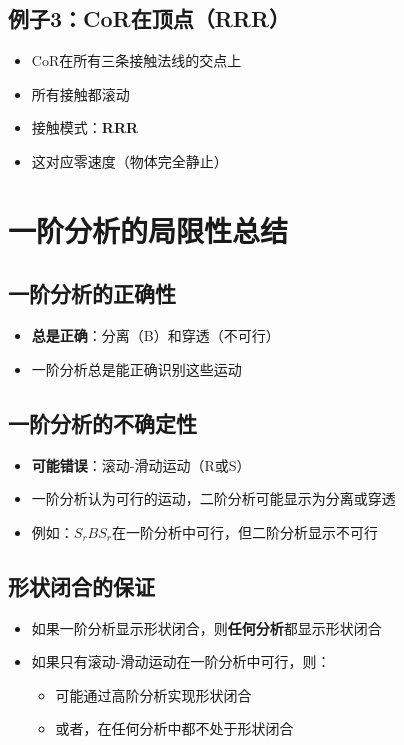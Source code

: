 \documentclass[12pt,a4paper]{article}
\begin{document}
\subsection{例子3：CoR在顶点（RRR）}

\begin{itemize}
\item CoR在所有三条接触法线的交点上
\item 所有接触都滚动
\item 接触模式：\textbf{RRR}
\item 这对应零速度（物体完全静止）
\end{itemize}

\section{一阶分析的局限性总结}

\subsection{一阶分析的正确性}

\begin{itemize}
\item \textbf{总是正确}：分离（B）和穿透（不可行）
\item 一阶分析总是能正确识别这些运动
\end{itemize}

\subsection{一阶分析的不确定性}

\begin{itemize}
\item \textbf{可能错误}：滚动-滑动运动（R或S）
\item 一阶分析认为可行的运动，二阶分析可能显示为分离或穿透
\item 例如：$S_rBS_r$在一阶分析中可行，但二阶分析显示不可行
\end{itemize}

\subsection{形状闭合的保证}

\begin{itemize}
\item 如果一阶分析显示形状闭合，则\textbf{任何分析}都显示形状闭合
\item 如果只有滚动-滑动运动在一阶分析中可行，则：
  \begin{itemize}
  \item 可能通过高阶分析实现形状闭合
  \item 或者，在任何分析中都不处于形状闭合
  \end{itemize}
\end{itemize}
\end{document}
